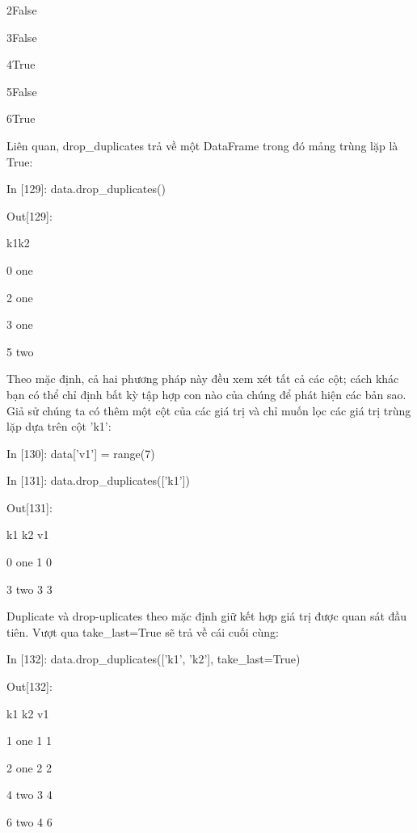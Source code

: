     \quad\textup{2\quad False}\par
    \quad\textup{3\quad False}\par
    \quad\textup{4\quad True}\par
    \quad\textup{5\quad False}\par
    \quad\textup{6\quad True}\par
Liên quan, drop\_duplicates trả về một DataFrame trong đó mảng trùng lặp là True:\par\par
    \quad\textup{      In [129]: {data.drop\_duplicates()} }\par
    \quad\textup{         Out[129]: }\par
    \quad\quad\textup{k1\quad k2}\par
    \quad\textup{0 one  }\par
    \quad\textup{2 one  }\par
    \quad\textup{3 one  }\par
    \quad\textup{5 two }\par
    \par
Theo mặc định, cả hai phương pháp này đều xem xét tất cả các cột; cách khác bạn có thể 
chỉ định bất kỳ tập hợp con nào của chúng để phát hiện các bản sao. Giả sử chúng ta có thêm một cột của các giá trị và chỉ muốn lọc các giá trị trùng lặp dựa trên cột 'k1': \par
\par
    \quad\textup{In [130]: data['v1'] = range(7) }\par
    \quad\textup{In [131]: data.drop\_duplicates(['k1'])}\par
    \quad\textup{Out[131]:}\par
    \quad\quad\textup{k1  k2  v1 }\par
    \quad\textup{0  one   1   0 }\par
    \quad\textup{3  two   3   3 }\par\par
Duplicate và drop-uplicates theo mặc định giữ kết hợp giá trị được quan sát đầu tiên. Vượt qua take\_last=True sẽ trả về cái cuối cùng:\par\par
    \quad\textup{ In [132]: data.drop\_duplicates(['k1', 'k2'], take\_last=True) }\par
    \quad\textup{Out[132]: }\par
    \quad\quad\textup{k1  k2  v1 }\par
    \quad\textup{1  one   1   1 }\par
    \quad\textup{2  one   2   2 }\par
    \quad\textup{4  two   3   4 }\par
    \quad\textup{6  two   4   6 }\par
    

